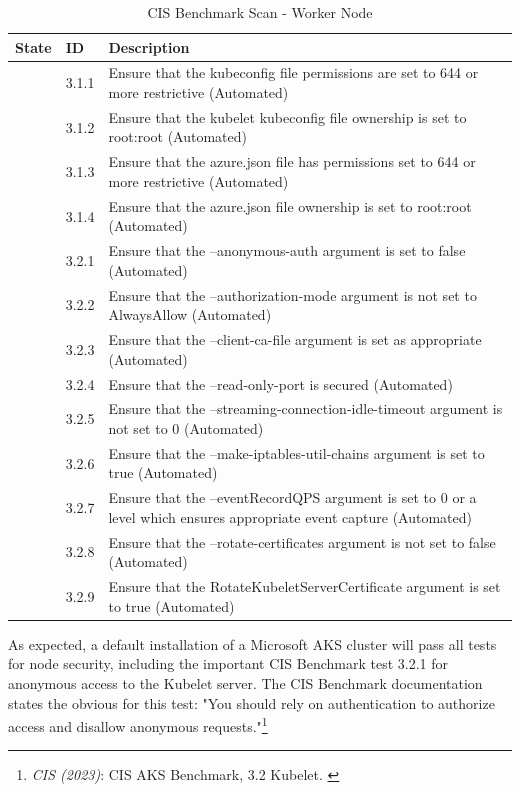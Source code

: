 \begin{table}[hp]
  \centering
  \caption{CIS Benchmark Scan - Worker Node}
    \begin{tabular}{| l | l | p{11cm} |}
    \hline
    State & ID & Description \\
    \hline\hline
    [PASS] & 3.1.1 & Ensure that the kubeconfig file permissions are set to 644 or more restrictive (Automated) \\
    \hline
    [PASS] & 3.1.2 & Ensure that the kubelet kubeconfig file ownership is set to root:root (Automated) \\
    \hline
    [PASS] & 3.1.3 & Ensure that the azure.json file has permissions set to 644 or more restrictive (Automated) \\
    \hline
    [PASS] & 3.1.4 & Ensure that the azure.json file ownership is set to root:root (Automated) \\
    \hline
    [PASS] & 3.2.1 & Ensure that the --anonymous-auth argument is set to false (Automated) \\
    \hline
    [PASS] & 3.2.2 & Ensure that the --authorization-mode argument is not set to AlwaysAllow (Automated) \\
    \hline
    [PASS] & 3.2.3 & Ensure that the --client-ca-file argument is set as appropriate (Automated) \\
    \hline
    [PASS] & 3.2.4 & Ensure that the --read-only-port is secured (Automated) \\
    \hline
    [PASS] & 3.2.5 & Ensure that the --streaming-connection-idle-timeout argument is not set to 0 (Automated) \\
    \hline
    [PASS] & 3.2.6 & Ensure that the --make-iptables-util-chains argument is set to true (Automated)  \\
    \hline
    [PASS] & 3.2.7 & Ensure that the --eventRecordQPS argument is set to 0 or a level which ensures appropriate event capture (Automated) \\
    \hline
    [PASS] & 3.2.8 & Ensure that the --rotate-certificates argument is not set to false (Automated) \\
    \hline
    [PASS] & 3.2.9 & Ensure that the RotateKubeletServerCertificate argument is set to true (Automated) \\
    \hline
    \end{tabular}%
  \label{tab:aksScanW}%
\end{table}%

As expected, a default installation of a Microsoft AKS cluster will pass all tests for node security, including the important CIS Benchmark test 3.2.1 for anonymous access to the Kubelet server. The CIS Benchmark documentation states the obvious for this test: "You should rely on authentication to authorize access and disallow anonymous requests."\footnote{\textit{CIS (2023)}: CIS AKS Benchmark, 3.2 Kubelet. \cite{cisAks}}

